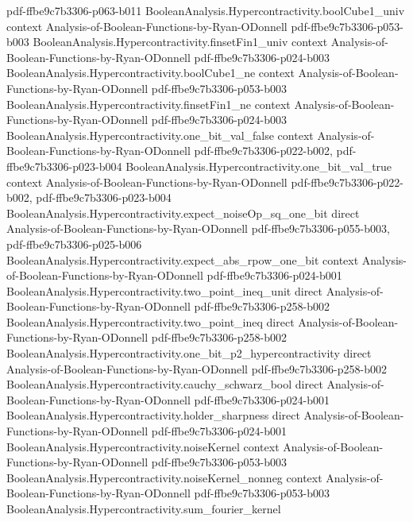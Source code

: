 \begin{theorem}
{    pdf-ffbe9c7b3306-p063-b011}
\proofstep
  {BooleanAnalysis.Hypercontractivity.boolCube1_univ}
  {context}
  {Analysis-of-Boolean-Functions-by-Ryan-ODonnell}
  {pdf-ffbe9c7b3306-p053-b003}
\proofstep
  {BooleanAnalysis.Hypercontractivity.finsetFin1_univ}
  {context}
  {Analysis-of-Boolean-Functions-by-Ryan-ODonnell}
  {pdf-ffbe9c7b3306-p024-b003}
\proofstep
  {BooleanAnalysis.Hypercontractivity.boolCube1_ne}
  {context}
  {Analysis-of-Boolean-Functions-by-Ryan-ODonnell}
  {pdf-ffbe9c7b3306-p053-b003}
\proofstep
  {BooleanAnalysis.Hypercontractivity.finsetFin1_ne}
  {context}
  {Analysis-of-Boolean-Functions-by-Ryan-ODonnell}
  {pdf-ffbe9c7b3306-p024-b003}
\proofstep
  {BooleanAnalysis.Hypercontractivity.one_bit_val_false}
  {context}
  {Analysis-of-Boolean-Functions-by-Ryan-ODonnell}
  {pdf-ffbe9c7b3306-p022-b002,
    pdf-ffbe9c7b3306-p023-b004}
\proofstep
  {BooleanAnalysis.Hypercontractivity.one_bit_val_true}
  {context}
  {Analysis-of-Boolean-Functions-by-Ryan-ODonnell}
  {pdf-ffbe9c7b3306-p022-b002,
    pdf-ffbe9c7b3306-p023-b004}
\proofstep
  {BooleanAnalysis.Hypercontractivity.expect_noiseOp_sq_one_bit}
  {direct}
  {Analysis-of-Boolean-Functions-by-Ryan-ODonnell}
  {pdf-ffbe9c7b3306-p055-b003,
    pdf-ffbe9c7b3306-p025-b006}
\proofstep
  {BooleanAnalysis.Hypercontractivity.expect_abs_rpow_one_bit}
  {context}
  {Analysis-of-Boolean-Functions-by-Ryan-ODonnell}
  {pdf-ffbe9c7b3306-p024-b001}
\proofstep
  {BooleanAnalysis.Hypercontractivity.two_point_ineq_unit}
  {direct}
  {Analysis-of-Boolean-Functions-by-Ryan-ODonnell}
  {pdf-ffbe9c7b3306-p258-b002}
\proofstep
  {BooleanAnalysis.Hypercontractivity.two_point_ineq}
  {direct}
  {Analysis-of-Boolean-Functions-by-Ryan-ODonnell}
  {pdf-ffbe9c7b3306-p258-b002}
\proofstep
  {BooleanAnalysis.Hypercontractivity.one_bit_p2_hypercontractivity}
  {direct}
  {Analysis-of-Boolean-Functions-by-Ryan-ODonnell}
  {pdf-ffbe9c7b3306-p258-b002}
\proofstep
  {BooleanAnalysis.Hypercontractivity.cauchy_schwarz_bool}
  {direct}
  {Analysis-of-Boolean-Functions-by-Ryan-ODonnell}
  {pdf-ffbe9c7b3306-p024-b001}
\proofstep
  {BooleanAnalysis.Hypercontractivity.holder_sharpness}
  {direct}
  {Analysis-of-Boolean-Functions-by-Ryan-ODonnell}
  {pdf-ffbe9c7b3306-p024-b001}
\proofstep
  {BooleanAnalysis.Hypercontractivity.noiseKernel}
  {context}
  {Analysis-of-Boolean-Functions-by-Ryan-ODonnell}
  {pdf-ffbe9c7b3306-p053-b003}
\proofstep
  {BooleanAnalysis.Hypercontractivity.noiseKernel_nonneg}
  {context}
  {Analysis-of-Boolean-Functions-by-Ryan-ODonnell}
  {pdf-ffbe9c7b3306-p053-b003}
\proofstep
  {BooleanAnalysis.Hypercontractivity.sum_fourier_kernel}

\end{theorem}
